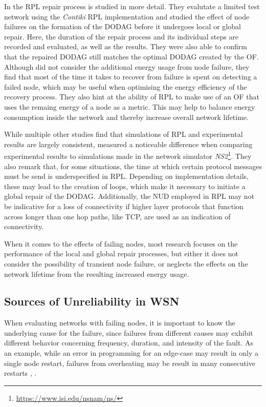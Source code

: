 \documentclass[
  a4paper,
  11pt,
  style=screen,
  extramargin,
  bcor=10mm,
  rgb,
  hyperrefdark,
  abstract=off,
  lnum,
]{tubsartcl}
\begin{document}
In \cite{korte2012study} the \ac{RPL} repair process is studied in more detail.
They evalutate a limited test network using the \emph{Contiki} \ac{RPL} implementation and studied the effect of node failures on the formation of the \ac{DODAG} before it undergoes local or global repair.
Here, the duration of the repair process and its individual steps are recorded and evaluated, as well as the results.
They were also able to confirm that the repaired \ac{DODAG} still matches the optimal \ac{DODAG} created by the \ac{OF}.
Although \cite{korte2012study} did not consider the additional energy usage from node failure, they find that most of the time it takes to recover from failure is spent on detecting a failed node, which may be useful when optimising the energy efficiency of the recovery process.
They also hint at the ability of \ac{RPL} to make use of an \ac{OF} that uses the remaing energy of a node as a metric.
This may help to balance energy consumption inside the network and thereby increase overall network lifetime.

While multiple other studies find that simulations of \ac{RPL} and experimental results are largely consistent, \cite{korte2012study} measured a noticeable difference when comparing experimental results to simulations made in the network simulator \emph{NS2}\footnote{\url{https://www.isi.edu/nsnam/ns/}}.
They also remark that, for some situations, the time at which certain protocol messages must be send is underspecified in \ac{RPL}.
Depending on implementation details, these may lead to the creation of loops, which make it necessary to initiate a global repair of the \ac{DODAG}.
Additionally, the \ac{NUD} employed in \ac{RPL} may not be indicative for a loss of connectivity if higher layer protocols that function across longer than one hop paths, like \ac{TCP}, are used as an indication of connectivity.

When it comes to the effects of failing nodes, most research focuses on the performance of the local and global repair processes, but either it does not consider the possibility of transient node failure, or neglects the effects on the network lifetime from the resulting increased energy usage.

\subsection{Sources of Unreliability in WSN}

When evaluating networks with failing nodes, it is important to know the underlying cause for the failure, since failures from different causes may exhibit different behavior concerning frequency, duration, and intensity of the fault.
As an example, while an error in programming for an edge-case may result in only a single node restart, failures from overheating may be result in many consecutive restarts \cite{boano2013hot}, \cite{boano2010impact}.
\end{document}
